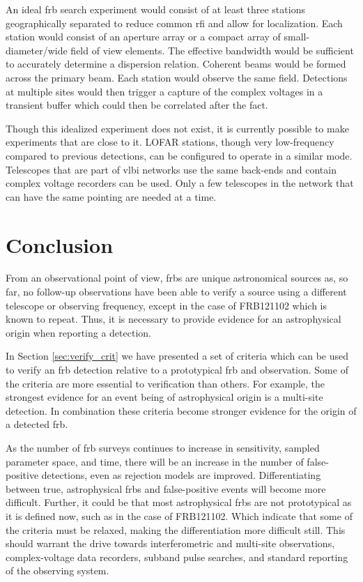 \documentclass[a4paper,fleqn,usenatbib]{mnras}
\begin{document}
An ideal \gls{frb} search experiment would consist of at least three stations
geographically separated to reduce common \gls{rfi} and allow for localization.
Each station would consist of an aperture array or a compact array of
small-diameter/wide field of view elements. The effective bandwidth would be
sufficient to accurately determine a dispersion relation.  Coherent beams would
be formed across the primary beam. Each station would observe the same field.
Detections at multiple sites would then trigger a capture of the complex
voltages in a transient buffer which could then be correlated after the fact. 

Though this idealized experiment does not exist, it is currently possible to
make experiments that are close to it. LOFAR stations, though very low-frequency
compared to previous detections, can be configured to operate in a similar mode.
Telescopes that are part of \gls{vlbi} networks use the same back-ends and
contain complex voltage recorders can be used. Only a few telescopes in the
network that can have the same pointing are needed at a time.

\section{Conclusion}

From an observational point of view, \glspl{frb} are unique astronomical sources
as, so far, no follow-up observations have been able to verify a source using a
different telescope or observing frequency, except in the case of FRB121102
which is known to repeat. Thus, it is necessary to provide evidence for an
astrophysical origin when reporting a detection.

In Section \ref{sec:verify_crit} we have presented a set of criteria which can
be used to verify an \gls{frb} detection relative to a prototypical \gls{frb}
and observation. Some of the criteria are more essential to verification than
others.  For example, the strongest evidence for an event being of astrophysical
origin is a multi-site detection.  In combination these criteria become stronger
evidence for the origin of a detected \gls{frb}.

As the number of \gls{frb} surveys continues to increase in sensitivity, sampled
parameter space, and time, there will be an increase in the number of
false-positive detections, even as rejection models are improved.
Differentiating between true, astrophysical \glspl{frb} and false-positive
events will become more difficult.  Further, it could be that most astrophysical
\glspl{frb} are not prototypical as it is defined now, such as in the case of
FRB121102. Which indicate that some of the criteria must be relaxed,
making the differentiation more difficult still.  This should warrant the drive
towards interferometric and multi-site observations, complex-voltage data
recorders, subband pulse searches, and standard reporting of the observing
system.
\end{document}
